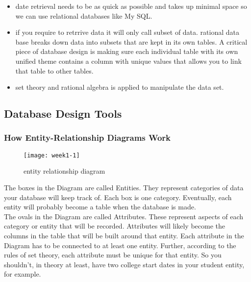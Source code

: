 \documentclass{article}
\begin{document}
\begin{itemize}

    \item date retrieval needs to be as quick as possible and takes up minimal space so we can use relational databases like My SQL. 
    
    \item  if you require to retrrive data it will only call subset of data. rational data base breaks down data into subsets that are kept in its own tables.  A critical piece of database design is making sure each individual table with its own unified theme contains a column with unique values that allows you to link that table to other tables. 
    
    \item set theory and rational algebra is applied to manipulate the data set.  
    
\end{itemize}
\pagebreak

\subsection*{Database Design Tools}
\subsubsection*{How Entity-Relationship Diagrams Work}


\begin{figure}[h]

\centering
\texttt{[image: week1-1]}

\caption{entity relationship diagram }
\end{figure}

The boxes in the Diagram are called Entities. They represent categories of data your database will keep track of. Each box is one category. Eventually, each entity will probably become a table when the database is made. \\

The ovals in the Diagram are called Attributes. These represent aspects of each category or entity that will be recorded. Attributes will likely become the columns in the table that will be built around that entity. Each attribute in the Diagram has to be connected to at least one entity. Further, according to the rules of set theory, each attribute must be unique for that entity. So you shouldn't, in theory at least, have two college start dates in your student entity, for example. \\
\end{document}
